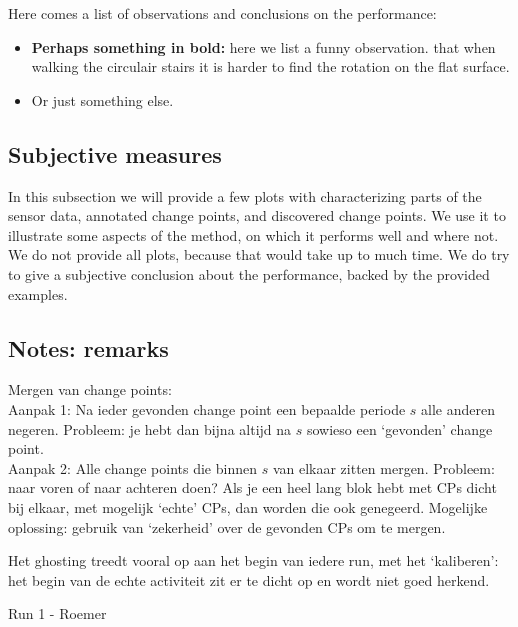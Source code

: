 

Here comes a list of observations and conclusions on the performance:
\begin{itemize}
  \item \textbf{Perhaps something in bold:} here we list a funny observation.
  \eg that when walking the circulair stairs it is harder to find the rotation on the flat surface.
  \item Or just something else.
\end{itemize}

\subsection{Subjective measures}
In this subsection we will provide a few plots with characterizing parts of the sensor data, annotated change points, and discovered change points.
We use it to illustrate some aspects of the method, on which it performs well and where not.
We do not provide all plots, because that would take up to much time.
We do try to give a subjective conclusion about the performance, backed by the provided examples.


\subsection{Notes: remarks}
Mergen van change points:\\

Aanpak 1: Na ieder gevonden change point een bepaalde periode $s$ alle anderen negeren. Probleem: je hebt dan bijna altijd na $s$ sowieso een `gevonden' change point.\\
Aanpak 2: Alle change points die binnen $s$ van elkaar zitten mergen. Probleem: naar voren of naar achteren doen? Als je een heel lang blok hebt met CPs dicht bij elkaar, met mogelijk `echte' CPs, dan worden die ook genegeerd. Mogelijke oplossing: gebruik van `zekerheid' over de gevonden CPs om te mergen.

Het ghosting treedt vooral op aan het begin van iedere run, met het `kaliberen': het begin van de echte activiteit zit er te dicht op en wordt niet goed herkend.

Run 1 - Roemer\\


